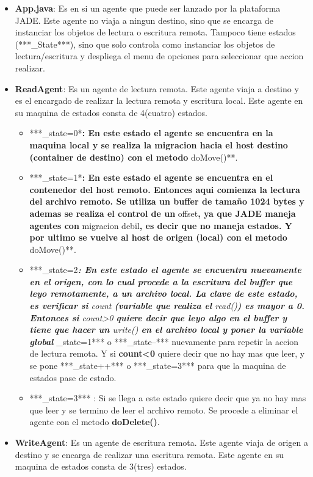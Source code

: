 \documentclass[11pt]{extarticle}
\begin{document}
\begin{itemize}
\item
  \textbf{App.java}: Es en si un agente que puede ser lanzado por la
  plataforma JADE. Este agente no viaja a ningun destino, sino que se
  encarga de instanciar los objetos de lectura o escritura remota.
  Tampoco tiene estados (***\_State***), sino que solo controla como
  instanciar los objetos de lectura/escritura y despliega el menu de
  opciones para seleccionar que accion realizar.
\item
  \textbf{ReadAgent}: Es un agente de lectura remota. Este agente viaja
  a destino y es el encargado de realizar la lectura remota y escritura
  local. Este agente en su maquina de estados consta de 4(cuatro)
  estados.

  \begin{itemize}
  \item
    ***\_state=0*\textbf{: En este estado el agente se encuentra en la
    maquina local y se realiza la migracion hacia el host destino
    (container de destino) con el metodo }doMove()**.
  \item
    ***\_state=1*\textbf{: En este estado el agente se encuentra en el
    contenedor del host remoto. Entonces aqui comienza la lectura del
    archivo remoto. Se utiliza un buffer de tamaño 1024 bytes y ademas
    se realiza el control de un }offset\textbf{, ya que JADE maneja
    agentes con }migracion debil\textbf{, es decir que no maneja
    estados. Y por ultimo se vuelve al host de origen (local) con el
    metodo }doMove()**.
  \item
    ***\_state=2\emph{\textbf{: En este estado el agente se encuentra
    nuevamente en el origen, con lo cual procede a la escritura del
    buffer que leyo remotamente, a un archivo local. La clave de este
    estado, es verificar si }count\textbf{ (variable que realiza el
    }read()\textbf{) es mayor a 0. Entonces si
    }count\textgreater{}0\textbf{ quiere decir que leyo algo en el
    buffer y tiene que hacer un }write()\textbf{ en el archivo local y
    poner la variable global }}\_state=1*** o ***\_state--*** nuevamente
    para repetir la accion de lectura remota. Y si
    \textbf{count\textless{}0} quiere decir que no hay mas que leer, y
    se pone ***\_state++*** o ***\_state=3*** para que la maquina de
    estados pase de estado.
  \item
    ***\_state=3*** : Si se llega a este estado quiere decir que ya no
    hay mas que leer y se termino de leer el archivo remoto. Se procede
    a eliminar el agente con el metodo \textbf{doDelete()}.
  \end{itemize}
\item
  \textbf{WriteAgent}: Es un agente de escritura remota. Este agente
  viaja de origen a destino y se encarga de realizar una escritura
  remota. Este agente en su maquina de estados consta de 3(tres)
  estados.


\end{itemize}
\end{document}

